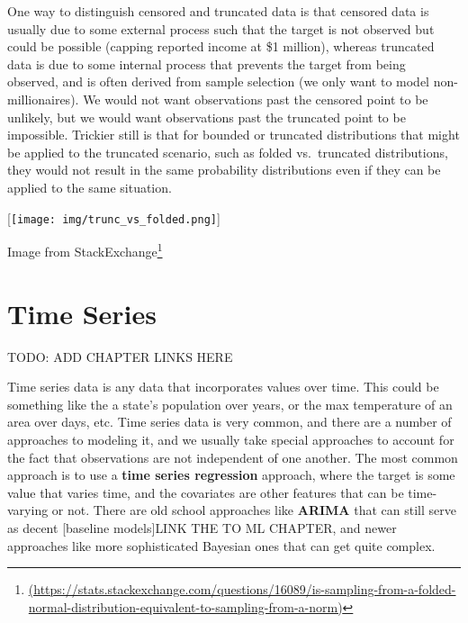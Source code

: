 \documentclass[
  letterpaper,
]{krantz}
\DeclareRobustCommand{\href}[2]{#2\footnote{\url{#1}}}
\begin{document}
\begin{tcolorbox}[enhanced jigsaw, colframe=quarto-callout-note-color-frame, opacityback=0, breakable, left=2mm, rightrule=.15mm, toprule=.15mm, arc=.35mm, leftrule=.75mm, colback=white, bottomrule=.15mm]

One way to distinguish censored and truncated data is that censored data
is usually due to some external process such that the target is not
observed but could be possible (capping reported income at \$1 million),
whereas truncated data is due to some internal process that prevents the
target from being observed, and is often derived from sample selection
(we only want to model non-millionaires). We would not want observations
past the censored point to be unlikely, but we would want observations
past the truncated point to be impossible. Trickier still is that for
bounded or truncated distributions that might be applied to the
truncated scenario, such as folded vs.~truncated distributions, they
would not result in the same probability distributions even if they can
be applied to the same situation.

{[}\texttt{[image: img/trunc\_vs\_folded.png]}{]}

Image from
\href{(https://stats.stackexchange.com/questions/16089/is-sampling-from-a-folded-normal-distribution-equivalent-to-sampling-from-a-norm)}{StackExchange}

\end{tcolorbox}

\section{Time Series}\label{sec-data-time}

TODO: ADD CHAPTER LINKS HERE

Time series data is any data that incorporates values over time. This
could be something like the a state's population over years, or the max
temperature of an area over days, etc. Time series data is very common,
and there are a number of approaches to modeling it, and we usually take
special approaches to account for the fact that observations are not
independent of one another. The most common approach is to use a
\textbf{time series regression} approach, where the target is some value
that varies time, and the covariates are other features that can be
time-varying or not. There are old school approaches like \textbf{ARIMA}
that can still serve as decent {[}baseline models{]}LINK THE TO ML
CHAPTER, and newer approaches like more sophisticated Bayesian ones that
can get quite complex.
\end{document}
